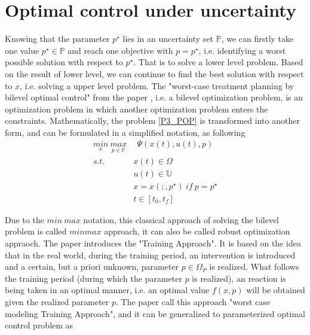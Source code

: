 
\chapter{Optimal control under uncertainty}
\label{Chapter3}


Knowing that the parameter $ p^\star$ lies in an uncertainty set $\mathbb{P} $, we can firstly take one value  $p^\star \in \mathbb{P}$ and  reach one objective with $p=p^\star$, i.e. identifying a worst possible solution with respect to $ p^\star $. That is to solve a lower level problem. Based on the result of lower level, we can continue to find the best solution with respect to $x$, i.e. solving a upper level problem. The "worst-case treatment planning by bilevel optimal control" from the paper  \cite{MatSch22}, i.e. a  bilevel optimization problem, is an optimization problem in which another optimization problem enters the constraints. Mathematically, the problem \ref{P3_POP} is transformed into another form, and can be formulated in a simplified notation, as following
\begin{equation}
	\begin{aligned}
		\underset{x}{min} \   \underset{p \in \mathbb{P}}{max} & \ \   \Psi(x(t), u(t), p) \\
		s.t.\ \  & x(t) \in \Omega \\
		& u(t) \in \mathbb{U}  \\
		& x = x(;,p^\star) \ if \ p = p^\star \\
		& t \in [t_0, t_f]
	\end{aligned}
	\label{P4_minmax}
\end{equation}


Due to the $min \ max$ notation, this classical approach of solving the bilevel problem is called $min max$ approach, it can also be called robust optimization appraoch. 
The paper \cite{MatSch22} introduces the "Training Approach".  It is based on the idea that in the real world, during the training period, an intervention is introduced and a certain, but a priori unknown, parameter $p \in \Omega_P$ is realized. What follows the training period (during which the parameter $p$ is realized), an reaction is being taken in an optimal manner, i.e. an optimal value $f(x,p)$ will be obtained given the realized parameter $p$. The paper \cite{MatSch22} call this approach "worst case modeling Training Approach", and it can be generalized to parameterized optimal control problem as 

